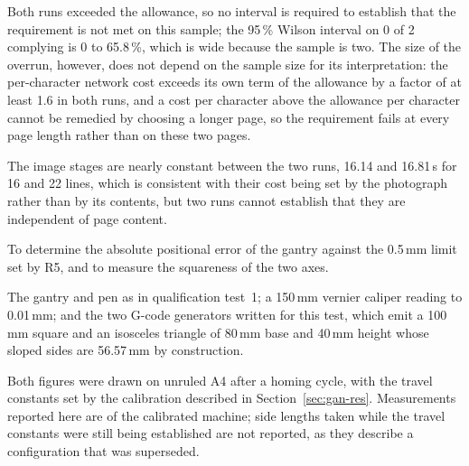         \medskip

        Both runs exceeded the allowance, so no interval is required to
        establish that the requirement is not met on this sample; the 95\,\%
        Wilson interval on 0 of 2 complying is 0 to 65.8\,\%, which is wide
        because the sample is two. The size of the overrun, however, does not
        depend on the sample size for its interpretation: the per-character
        network cost exceeds its own term of the allowance by a factor of at
        least 1.6 in both runs, and a cost per character above the allowance per
        character cannot be remedied by choosing a longer page, so the
        requirement fails at every page length rather than on these two pages.

        The image stages are nearly constant between the two runs, 16.14 and
        16.81\,s for 16 and 22 lines, which is consistent with their cost being
        set by the photograph rather than by its contents, but two runs cannot
        establish that they are independent of page content.

\medskip

        \medskip

        To determine the absolute positional error of the gantry against the
        0.5\,mm limit set by R5, and to measure the squareness of the two axes.

        \medskip

        The gantry and pen as in qualification test~1; a 150\,mm vernier caliper
        reading to 0.01\,mm; and the two G-code generators written for this
        test, which emit a 100\,mm square and an isosceles triangle of 80\,mm
        base and 40\,mm height whose sloped sides are 56.57\,mm by construction.

        \medskip

        Both figures were drawn on unruled A4 after a homing cycle, with the
        travel constants set by the calibration described in
        Section~\ref{sec:gan-res}. Measurements reported here are of the
        calibrated machine; side lengths taken while the travel constants were
        still being established are not reported, as they describe a
        configuration that was superseded.

